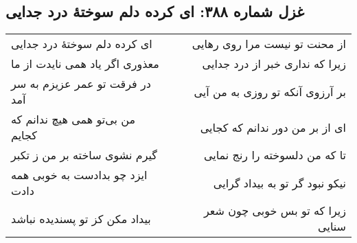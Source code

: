 \begin{center}
\section*{غزل شماره ۳۸۸: ای کرده دلم سوختهٔ درد جدایی}
\label{sec:388}
\begin{longtable}{l p{0.5cm} r}
ای کرده دلم سوختهٔ درد جدایی
&&
از محنت تو نیست مرا روی رهایی
\\
معذوری اگر یاد همی نایدت از ما
&&
زیرا که نداری خبر از درد جدایی
\\
در فرقت تو عمر عزیزم به سر آمد
&&
بر آرزوی آنکه تو روزی به من آیی
\\
من بی‌تو همی هیچ ندانم که کجایم
&&
ای از بر من دور ندانم که کجایی
\\
گیرم نشوی ساخته بر من ز تکبر
&&
تا که من دلسوخته را رنج نمایی
\\
ایزد چو بدادست به خوبی همه دادت
&&
نیکو نبود گر تو به بیداد گرایی
\\
بیداد مکن کز تو پسندیده نباشد
&&
زیرا که تو بس خوبی چون شعر سنایی
\\
\end{longtable}
\end{center}
